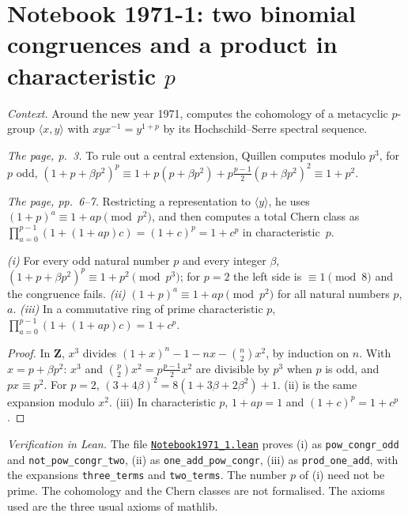 \section[Notebook 1971-1: two binomial congruences]{Notebook 1971-1: two binomial congruences and a product in characteristic $p$\protect{}}\label{sec:quillen-1971-1}

\emph{Context.} Around the new year 1971,  computes the cohomology of a metacyclic $p$-group $\langle x, y\rangle$ with $xyx^{-1} = y^{1+p}$ by its Hochschild--Serre spectral sequence.

\emph{The page, p.~3.} To rule out a central extension, Quillen computes modulo $p^3$, for $p$ odd, $(1 + p + \beta p^2)^p \equiv 1 + p(p + \beta p^2) + p\frac{p-1}{2}(p + \beta p^2)^2 \equiv 1 + p^2$.

\emph{The page, pp.~6--7.} Restricting a representation to $\langle y\rangle$, he uses $(1 + p)^a \equiv 1 + ap \pmod{p^2}$, and then computes a total Chern class as $\prod_{a=0}^{p-1}(1 + (1 + ap)c) = (1 + c)^p = 1 + c^p$ in characteristic~$p$.

\begin{encadre}
\begin{theoreme}\label{thm:quillen-1971-1}
\emph{(i)} For every odd natural number $p$ and every integer $\beta$, $(1 + p + \beta p^2)^p \equiv 1 + p^2 \pmod{p^3}$; for $p = 2$ the left side is $\equiv 1 \pmod 8$ and the congruence fails. \emph{(ii)} $(1 + p)^a \equiv 1 + ap \pmod{p^2}$ for all natural numbers $p$, $a$. \emph{(iii)} In a commutative ring of prime characteristic $p$, $\prod_{a=0}^{p-1}(1 + (1 + ap)c) = 1 + c^p$.
\end{theoreme}
\end{encadre}

\begin{proof}
In $\mathbf Z$, $x^3$ divides $(1+x)^n - 1 - nx - \binom n2x^2$, by induction on $n$. With $x = p + \beta p^2$: $x^3$ and $\binom p2 x^2 = p\frac{p-1}{2}x^2$ are divisible by $p^3$ when $p$ is odd, and $px \equiv p^2$. For $p = 2$, $(3 + 4\beta)^2 = 8(1 + 3\beta + 2\beta^2) + 1$. (ii) is the same expansion modulo $x^2$. (iii) In characteristic $p$, $1 + ap = 1$ and $(1 + c)^p = 1 + c^p$.
\end{proof}

\emph{Verification in Lean.} The file \href{\leanblobmain/Notebook1971_1.lean}{\texttt{Notebook1971\_1.\allowbreak{}lean}} proves (i) as \texttt{pow\_congr\_odd} and \texttt{not\_pow\_congr\_two}, (ii) as \texttt{one\_add\_pow\_congr}, (iii) as \texttt{prod\_one\_add}, with the expansions \texttt{three\_terms} and \texttt{two\_terms}. The number $p$ of (i) need not be prime. The cohomology and the Chern classes are not formalised. The axioms used are the three usual axioms of mathlib.

